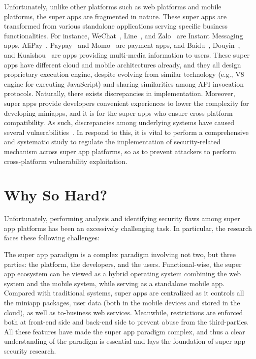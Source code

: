 \documentclass{osudissert96}
\renewcommand{\paragraph}[1]{\vspace{0.05in}\noindent{\bf{#1}.}}
\begin{document}
\paragraph{Fragmentation and regulation} Unfortunately, unlike other platforms such as web platforms and mobile platforms, the super apps are fragmented in nature. These super apps are transformed from various standalone applications serving specific business functionalities. For instance, WeChat~\cite{wechat}, Line~\cite{linedoc}, and Zalo~\cite{zalodoc} are Instant Messaging apps, AliPay~\cite{alipaydoc}, Paypay~\cite{paypaydoc} and Momo~\cite{momodoc} are payment apps, and Baidu~\cite{baidudoc}, Douyin~\cite{douyindoc}, and Kuaishou~\cite{kuaishoudoc} are apps providing multi-media information to users. These super apps have different cloud and mobile architectures already, and they all design proprietary execution engine, despite evolving from similar technology (e.g., V8 engine for executing JavaScript) and sharing similarities among API invocation protocols. Naturally, there exists discrepancies in implementation. Moreover, super apps provide developers convenient experiences to lower the complexity for developing miniapps, and it is for the super apps who ensure cross-platform compatibility. As such, discrepancies among underlying systems have caused several vulnerabilities~\cite{rootfree,wang2023one}. In respond to this, it is vital to perform a comprehensive and systematic study to regulate the implementation of security-related mechanism across super app platforms, so as to prevent attackers to perform cross-platform vulnerability exploitation.


\section{Why So Hard?}
Unfortunately, performing analysis and identifying security flaws among super app platforms has been an excessively challenging task. In particular, the research faces these following challenges:

\paragraph{Complex paradigm} The super app paradigm is a complex paradigm involving not two, but three parties: the platform, the developers, and the users. Functional-wise, the super app ecosystem can be viewed as a hybrid operating system combining the web system and the mobile system, while serving as a standalone mobile app. Compared with traditional systems, super apps are centralized as it controls all the miniapp packages, user data (both in the mobile devices and stored in the cloud), as well as to-business web services. Meanwhile, restrictions are enforced both at front-end side and back-end side to prevent abuse from the third-parties. All these features have made the super app paradigm complex, and thus a clear understanding of the paradigm is essential and lays the foundation of super app security research.
\end{document}
